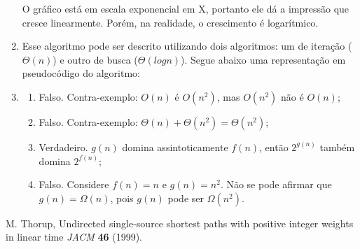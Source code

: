 \documentclass[11pt]{article}
\begin{document}
\begin{enumerate}
    O gráfico está em escala exponencial em X, portanto ele dá a impressão que
cresce linearmente. Porém, na realidade, o crescimento é logarítmico.
        \item Esse algoritmo pode ser descrito utilizando dois algoritmos: um
de iteração ($\Theta(n)$) e outro de busca ($\Theta(logn)$). Segue abaixo uma
representação em pseudocódigo do algoritmo:
        \begin{algorithmic}[1]
                 
                        \State {}
                    \EndIf
                \EndFor
                \State {}
            \EndFunction
        \end{algorithmic}
        \item
            \begin{enumerate}
                \item Falso. Contra-exemplo: $O(n)$ é $O(n^2)$, mas $O(n^2)$ não é $O(n)$;
                \item Falso. Contra-exemplo: $\Theta(n) + \Theta(n^2) = \Theta(n^2)$;
                \item Verdadeiro. $g(n)$ domina assintoticamente $f(n)$, então $2^{g(n)}$ também domina $2^{f(n)}$;
                \item Falso. Considere $f(n) = n$ e $g(n) = n^2$. Não se pode afirmar que $g(n) = \Omega(n)$, pois $g(n)$ pode ser $\Omega(n^2)$.
            \end{enumerate}
\end{enumerate}

\begin{thebibliography}{1}
    M. Thorup, Undirected single-source shortest paths with positive integer
weights in linear time {\em JACM} {\bf 46} (1999).  \end{thebibliography}
\end{document}
